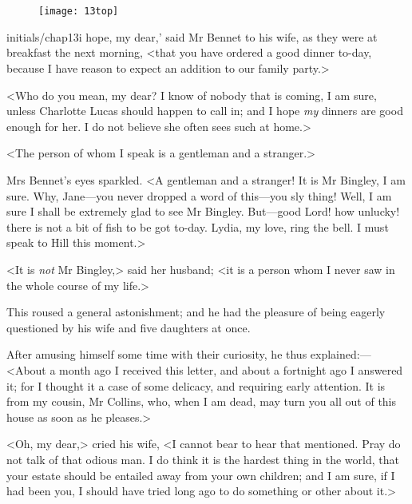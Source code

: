 \chapter[Chapter \thechapter]{}
	
	\begin{figure}[t!]
\centering
\texttt{[image: 13top]}
\end{figure}

\lettrine[ante=`,lines=4,image=true,findent=5pt,realheight=true]{initials/chap13i}{} hope, my dear,' said Mr Bennet to his wife, as they were at breakfast the next morning, <that you have ordered a good dinner to-day, because I have reason to expect an addition to our family party.>

\zz
<Who do you mean, my dear? I know of nobody that is coming, I am sure, unless Charlotte Lucas should happen to call in; and I hope \textit{my} dinners are good enough for her. I do not believe she often sees such at home.>

<The person of whom I speak is a gentleman and a stranger.>

Mrs Bennet's eyes sparkled. <A gentleman and a stranger! It is Mr Bingley, I am sure. Why, Jane—you never dropped a word of this—you sly thing! Well, I am sure I shall be extremely glad to see Mr Bingley. But—good Lord! how unlucky! there is not a bit of fish to be got to-day. Lydia, my love, ring the bell. I must speak to Hill this moment.>

<It is \textit{not} Mr Bingley,> said her husband; <it is a person whom I never saw in the whole course of my life.>

This roused a general astonishment; and he had the pleasure of being eagerly questioned by his wife and five daughters at once.

After amusing himself some time with their curiosity, he thus explained:— <About a month ago I received this letter, and about a fortnight ago I answered it; for I thought it a case of some delicacy, and requiring early attention. It is from my cousin, Mr Collins, who, when I am dead, may turn you all out of this house as soon as he pleases.>

<Oh, my dear,> cried his wife, <I cannot bear to hear that mentioned. Pray do not talk of that odious man. I do think it is the hardest thing in the world, that your estate should be entailed away from your own children; and I am sure, if I had been you, I should have tried long ago to do something or other about it.>

